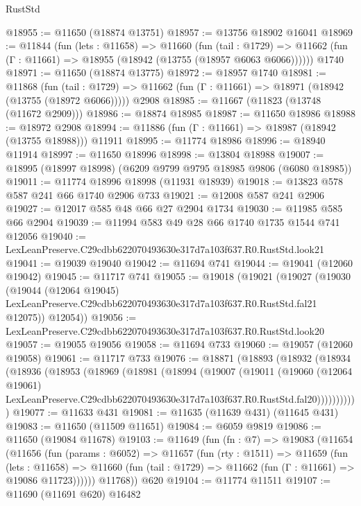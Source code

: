 \begin{lexlean}{RustStd}
\begin{coremodule}
@18955 := @11650 (@18874 @13751)
@18957 := @13756 @18902 @16041
@18969 := @11844
    (fun (lets : @11658) =>
    @11660
      (fun (tail : @1729) =>
      @11662 (fun (Γ : @11661) => @18955 (@18942 (@13755 (@18957 @6063 @6066))))))
    @1740
@18971 := @11650 (@18874 @13775)
@18972 := @18957 @1740
@18981 := @11868
    (fun (tail : @1729) => @11662 (fun (Γ : @11661) => @18971 (@18942 (@13755 (@18972 @6066)))))
    @2908
@18985 := @11667 (@11823 (@13748 (@11672 @2909)))
@18986 := @18874 @18985
@18987 := @11650 @18986
@18988 := @18972 @2908
@18994 := @11886 (fun (Γ : @11661) => @18987 (@18942 (@13755 @18988))) @11911
@18995 := @11774 @18986
@18996 := @18940 @11914
@18997 := @11650 @18996
@18998 := @13804 @18988
@19007 := @18995 (@18997 @18998) (@6209 @9799 @9795 @18985 @9806 (@6080 @18985))
@19011 := @11774 @18996 @18998 (@11931 @18939)
@19018 := @13823 @578 @587 @241 @66 @1740 @2906 @733
@19021 := @12008 @587 @241 @2906
@19027 := @12017 @585 @48 @66 @27 @2904 @1734
@19030 := @11985 @585 @66 @2904
@19039 := @11994 @583 @49 @28 @66 @1740 @1735 @1544 @741 @12056
@19040 := LexLeanPreserve.C29cdbb622070493630e317d7a103f637.R0.RustStd.look21
@19041 := @19039 @19040
@19042 := @11694 @741
@19044 := @19041 (@12060 @19042)
@19045 := @11717 @741
@19055 := @19018
    (@19021
      (@19027
        (@19030
          (@19044
            (@12064 @19045)
            LexLeanPreserve.C29cdbb622070493630e317d7a103f637.R0.RustStd.fal21
            @12075))
        @12054))
@19056 := LexLeanPreserve.C29cdbb622070493630e317d7a103f637.R0.RustStd.look20
@19057 := @19055 @19056
@19058 := @11694 @733
@19060 := @19057 (@12060 @19058)
@19061 := @11717 @733
@19076 := @18871
    (@18893
      (@18932
        (@18934
          (@18936
            (@18953
              (@18969
                (@18981
                  (@18994
                    (@19007
                      (@19011
                        (@19060
                          (@12064 @19061)
                          LexLeanPreserve.C29cdbb622070493630e317d7a103f637.R0.RustStd.fal20)))))))))))
@19077 := @11633 @431
@19081 := @11635 (@11639 @431) (@11645 @431)
@19083 := @11650 (@11509 @11651)
@19084 := @6059 @9819
@19086 := @11650 (@19084 @11678)
@19103 := @11649
    (fun (fn : @7) =>
    @19083
      (@11654
        (@11656
          (fun (params : @6052) =>
          @11657
            (fun (rty : @1511) =>
            @11659
              (fun (lets : @11658) =>
              @11660 (fun (tail : @1729) => @11662 (fun (Γ : @11661) => @19086 @11723))))))
        @11768))
    @620
@19104 := @11774 @11511
@19107 := @11690 (@11691 @620) @16482

\end{coremodule}
\end{lexlean}
